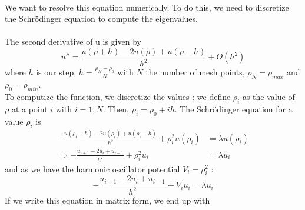 \documentclass[a4paper, twoside, 11pt]{report}
\theoremstyle{theorem}
\theoremstyle{remark}
\theoremstyle{exemple}
\begin{document}
    \paragraph{}We want to resolve this equation numerically. To do this, we need to discretize the Schrödinger equation to compute the eigenvalues.
    \paragraph{}The second derivative of u is given by 
        \begin{equation*}
             u''=\frac{u(\rho+h) -2u(\rho) +u(\rho-h)}{h^2} +O(h^2)
        \end{equation*}
    where $h$ is our step, $h=\frac{\rho_N - \rho_0}{N}$ with $N$ the number of mesh points, $\rho_N = \rho_{max}$ and $\rho_0 = \rho_{min}$. \\
    To computize the function, we discretize the values : we define $\rho_i$ as the value of $\rho$ at a point $i$ with $i = \overline{1,N}$. Then, $\rho_i = \rho_0 + ih$. The Schrödinger equation for a value $\rho_i$ is
        \begin{align}
            -\frac{u(\rho_i+h) -2u(\rho_i) +u(\rho_i-h)}{h^2}+\rho_i^2u(\rho_i)  &= \lambda u(\rho_i) \nonumber \\
            \Longrightarrow -\frac{u_{i+1} -2u_i +u_{i-1}}{h^2}+\rho_i^2u_i &= \lambda u_i \tag{3}
        \end{align}
    and as we have the harmonic oscillator potential $V_i = \rho_i^2$ :  
       \begin{equation*}
            -\frac{u_{i+1} -2u_i +u_{i-1}}{h^2}+V_i u_i = \lambda u_i
        \end{equation*}
    If we write this equation in matrix form, we end up with 
\end{document}
